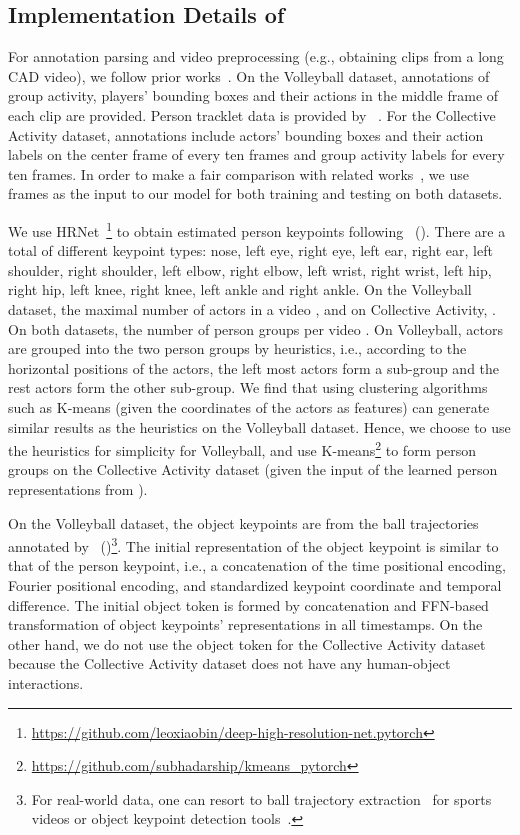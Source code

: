 \documentclass[runningheads]{llncs}
\begin{document}
 
\subsection{Implementation Details of \textbf{\ours}}
For annotation parsing and video preprocessing (e.g., obtaining clips from a long CAD video), we follow prior works~\cite{yuan2021spatio,arg}.
On the Volleyball dataset, annotations of group activity, 
players' bounding boxes and their actions in the middle frame of each clip are provided. 
Person tracklet data is provided by ~\cite{sendo2019heatmapping}.
For the Collective Activity dataset, annotations include actors’ bounding boxes and their action labels on the center frame of every ten frames and group activity labels for every ten frames. 
In order to make a fair comparison with related works~\cite{yuan2021learning,yuan2021spatio,actor-transformer,arg}, we use  frames as the input to our model for both training and testing on both datasets.


We use HRNet~\cite{hrnet}\footnote{\url{https://github.com/leoxiaobin/deep-high-resolution-net.pytorch}} to obtain estimated person keypoints following~\cite{actor-transformer,yuan2021learning} ().
There are a total of  different keypoint types: nose, left eye, right eye, left ear, right ear, left shoulder, right shoulder, left elbow, right elbow, left wrist, right wrist, left hip, right hip, left knee, right knee, left ankle and right ankle. 
On the Volleyball dataset,
the maximal number of actors in a video , and on Collective Activity, .
On both datasets, the number of person groups per video .
On Volleyball, actors are grouped into the two person groups by heuristics, i.e., according to the horizontal positions of the actors,
the left most  actors form a sub-group and the rest actors form the other sub-group. 
We find that using clustering algorithms such as K-means (given the coordinates of the actors as features) can generate similar results as the heuristics on the Volleyball dataset. Hence, we choose to use the heuristics for simplicity for Volleyball,
and use K-means\footnote{\url{https://github.com/subhadarship/kmeans_pytorch}} to form person groups on the Collective Activity dataset (given the input of the learned person representations from \ourseos).  


On the Volleyball dataset, the object keypoints are from the ball trajectories annotated by~\cite{GIRN} 
()\footnote{For real-world data, one can resort to ball trajectory extraction~\cite{balltracktool,patrick2021keeping} for sports videos or object keypoint detection tools~\cite{huangyi,blomqvist2022semi,lu2021few}. }. The initial representation of the object  keypoint is similar to that of the person keypoint, i.e., a concatenation of the time positional encoding, Fourier positional encoding, and standardized keypoint coordinate and temporal difference. The initial object token is formed by concatenation and FFN-based transformation of object keypoints’ representations in all timestamps.
On the other hand, we do not use the object token for the Collective Activity dataset because the Collective Activity dataset does not have any human-object interactions.
\end{document}
